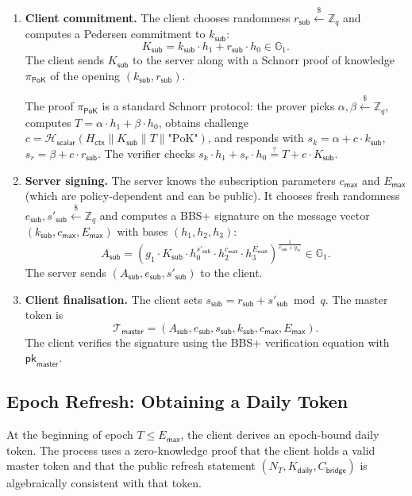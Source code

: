 \documentclass[11pt]{article}
\theoremstyle{definitionstyle}
\theoremstyle{plain}
\begin{document}
\begin{enumerate}[leftmargin=*]
\item \textbf{Client commitment.}
  The client chooses randomness $r_{\mathsf{sub}} \xleftarrow{\$} \mathbb{Z}_q$ and computes a Pedersen commitment to $k_{\mathsf{sub}}$:
  \[
  K_{\mathsf{sub}} = k_{\mathsf{sub}} \cdot h_1 + r_{\mathsf{sub}} \cdot h_0 \in \mathbb{G}_1.
  \]
  The client sends $K_{\mathsf{sub}}$ to the server along with a Schnorr proof of knowledge $\pi_{\mathsf{PoK}}$ of the opening $(k_{\mathsf{sub}}, r_{\mathsf{sub}})$.

  The proof $\pi_{\mathsf{PoK}}$ is a standard Schnorr protocol: the prover picks $\alpha, \beta \xleftarrow{\$} \mathbb{Z}_q$, computes $T = \alpha \cdot h_1 + \beta \cdot h_0$, obtains challenge $c = \mathcal{H}_{\mathsf{scalar}}(H_{\mathsf{ctx}} \parallel K_{\mathsf{sub}} \parallel T \parallel \text{"PoK"})$, and responds with $s_k = \alpha + c \cdot k_{\mathsf{sub}}$, $s_r = \beta + c \cdot r_{\mathsf{sub}}$. The verifier checks $s_k \cdot h_1 + s_r \cdot h_0 \stackrel{?}{=} T + c \cdot K_{\mathsf{sub}}$.

\item \textbf{Server signing.}
  The server knows the subscription parameters $c_{\mathsf{max}}$ and $E_{\mathsf{max}}$ (which are policy-dependent and can be public). It chooses fresh randomness $e_{\mathsf{sub}}, s'_{\mathsf{sub}} \xleftarrow{\$} \mathbb{Z}_q$ and computes a BBS+ signature on the message vector $(k_{\mathsf{sub}}, c_{\mathsf{max}}, E_{\mathsf{max}})$ with bases $(h_1, h_2, h_3)$:
  \[
  A_{\mathsf{sub}} = \left( g_1 \cdot K_{\mathsf{sub}} \cdot h_0^{s'_{\mathsf{sub}}} \cdot h_2^{c_{\mathsf{max}}} \cdot h_3^{E_{\mathsf{max}}} \right)^{\frac{1}{e_{\mathsf{sub}} + y_m}} \in \mathbb{G}_1.
  \]
  The server sends $(A_{\mathsf{sub}}, e_{\mathsf{sub}}, s'_{\mathsf{sub}})$ to the client.

\item \textbf{Client finalisation.}
  The client sets $s_{\mathsf{sub}} = r_{\mathsf{sub}} + s'_{\mathsf{sub}} \bmod q$. The master token is
  \[
  \mathcal{T}_{\mathsf{master}} = (A_{\mathsf{sub}}, e_{\mathsf{sub}}, s_{\mathsf{sub}}, k_{\mathsf{sub}}, c_{\mathsf{max}}, E_{\mathsf{max}}).
  \]
  The client verifies the signature using the BBS+ verification equation with $\mathsf{pk}_{\mathsf{master}}$.
\end{enumerate}

\subsection{Epoch Refresh: Obtaining a Daily Token}
At the beginning of epoch $T \le E_{\mathsf{max}}$, the client derives an epoch-bound daily token. The process uses a zero-knowledge proof that the client holds a valid master token and that the public refresh statement $(N_T, K_{\mathsf{daily}}, C_{\mathsf{bridge}})$ is algebraically consistent with that token.
\end{document}
